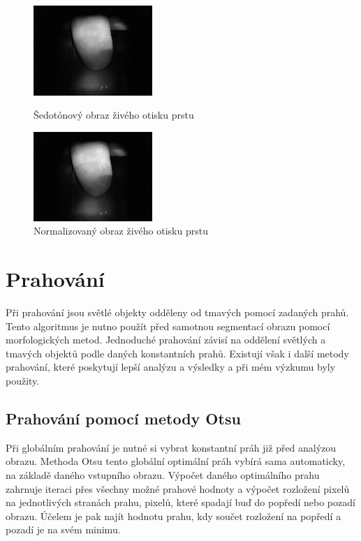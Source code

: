 \begin{figure}[htbp]
  \begin{minipage}[b]{0.5\linewidth}
    \centering
    \includegraphics[width=170px]{obrazky-figures/live87grayscale.png}
    \caption{Šedotónový obraz živého otisku prstu}
  \end{minipage}
  \hspace{0.5cm}
  \begin{minipage}[b]{0.5\linewidth}
    \centering
    \includegraphics[width=170px]{obrazky-figures/live87norm.png}
    \caption{Normalizovaný obraz živého otisku prstu}
  \end{minipage}
\end{figure}



\section{Prahování}
Při prahování jsou světlé objekty odděleny od tmavých pomocí zadaných prahů. Tento algoritmus je nutno použít před samotnou segmentací obrazu pomocí morfologických metod. Jednoduché prahování závisí na oddělení světlých a tmavých objektů podle daných konstantních prahů. Existují však i další metody prahování, které poskytují lepší analýzu a výsledky a při mém výzkumu byly použity.

\subsection{Prahování pomocí metody Otsu}
Při globálním prahování je nutné si vybrat konstantní práh již před analýzou obrazu. Methoda Otsu tento globální optimální práh vybírá sama automaticky, na základě daného vstupního obrazu. \cite{OpenCVTresholding} Výpočet daného optimálního prahu zahrnuje iteraci přes všechny možné prahové hodnoty a výpočet rozložení pixelů na jednotlivých stranách prahu, pixelů, které spadají buď do popředí nebo pozadí obrazu. Účelem je pak najít hodnotu prahu, kdy součet rozložení na popředí a pozadí je na svém minimu. \cite{LabBookPagesTresholding}

